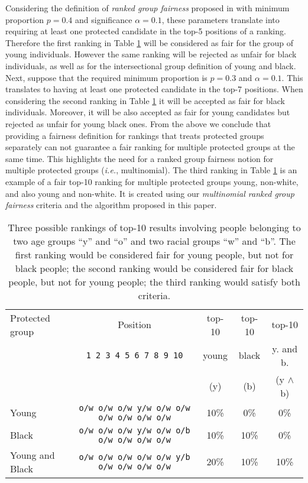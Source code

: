 Considering the definition of \textit{ranked group fairness} proposed in \cite{zehlike2017fair} with minimum proportion $p=0.4$ and significance $\alpha=0.1$, these parameters translate into requiring at least one protected candidate in the top-5 positions of a ranking.
Therefore the first ranking in Table \ref{tbl:multinomial_intro_example} will be considered as fair for the group of young individuals.
%
However the same ranking will be rejected as unfair for black individuals, as well as for the intersectional group definition of young and black.
%
Next, suppose that the required minimum proportion is $p = 0.3$ and $\alpha = 0.1$. This translates to having at least one protected candidate in the top-7 positions.
When considering the second ranking in Table \ref{tbl:multinomial_intro_example} it will be accepted as fair for black individuals. Moreover, it will be also accepted as fair for young candidates but rejected as unfair for young black ones.
%
From the above we conclude that providing a fairness definition for rankings that treats protected groups separately can not guarantee a fair ranking for multiple protected groups at the same time. This highlights the need for a ranked group fairness notion for multiple protected groups ({\em i.e.}, multinomial).
%
The third ranking in Table \ref{tbl:multinomial_intro_example} is an example of a fair top-10 ranking for multiple protected groups young, non-white, and also young and non-white. It is created using our \textit{multinomial ranked group fairness} criteria and the algorithm proposed in this paper.
\medskip
\begin{table}[t]
	\caption{Three possible rankings of top-10 results involving people belonging to two age groups ``y'' and ``o'' and two racial groups ``w'' and ``b''. The first ranking would be considered fair for young people, but not for black people; the second ranking would be considered fair for black people, but not for young people; the third ranking would satisfy both criteria.
		\label{tbl:multinomial_intro_example}}
	\centering\small\begin{tabular}{lcccc}\toprule
		Protected group & Position					  & top-10 & top-10  & top-10 \\
		& \texttt{1 2 3 4 5 6 7 8 9 10} & young & black & y. and b. \\
		&                               &  (y)  & (b)  &  (y $\wedge$ b)\\
		\midrule
		Young  & \texttt{o/w o/w o/w y/w o/w o/w o/w o/w o/w o/w} & 10\% & 0\% & 0\% \\
		Black & \texttt{o/w o/w o/w y/w o/w o/b o/w o/w o/w o/w} & 10\% & 10\% & 0\% \\
		Young and Black & \texttt{o/w o/w o/w o/w o/w y/b o/w o/w o/w o/w} & 20\% & 10\% & 10\% \\
		\bottomrule
	\end{tabular}

\end{table}


